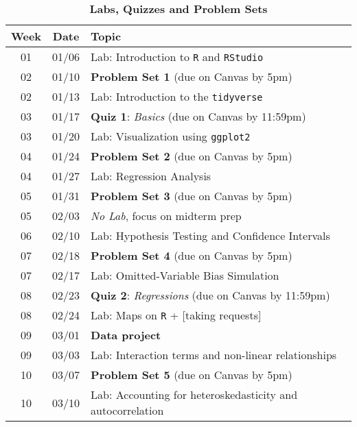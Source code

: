 \documentclass[10pt]{article}
\newcommand{\ra}[1]{\renewcommand{\arraystretch}{#1}}
\begin{document}
\newpage

\begin{table}[h!]
	\caption*{\large\textbf{Labs, Quizzes and Problem Sets}}
	\centering
	\ra{1.5}
	\begin{tabular}{@{\extracolsep{0.5cm}} c c l @{}}
		\toprule
		\textbf{Week} & \textbf{Date} & \textbf{Topic}  \\ \toprule
		01 & 01/06 & Lab: Introduction to \texttt{R} and \texttt{RStudio} \\ 
		02 & 01/10 & \textbf{Problem Set 1} (due on Canvas by 5pm)  \\
		02 & 01/13 & Lab: Introduction to the \texttt{tidyverse} \\ \midrule 
		03 & 01/17 & \textbf{Quiz 1}: \textit{Basics} (due on Canvas by 11:59pm) \\
		03 & 01/20 & Lab: Visualization using \texttt{ggplot2} \\
		04 & 01/24 & \textbf{Problem Set 2} (due on Canvas by 5pm)  \\ 
		04 & 01/27 & Lab: Regression Analysis \\ 
		05 & 01/31 & \textbf{Problem Set 3} (due on Canvas by 5pm) \\ 
		05 & 02/03 & {\it No Lab}, focus on midterm prep \\  \midrule
		06 & 02/10 & Lab: Hypothesis Testing and Confidence Intervals \\
		07 & 02/18 & \textbf{Problem Set 4} (due on Canvas by 5pm)  \\ 
		07 & 02/17 & Lab: Omitted-Variable Bias Simulation \\
		08 & 02/23 & \textbf{Quiz 2}: \textit{Regressions} (due on Canvas by 11:59pm) \\ 
		08 & 02/24 & Lab: Maps on \texttt{R} + [taking requests] \\ \midrule
		09 & 03/01 & {\bf Data project}  \\  
		09 & 03/03 & Lab: Interaction terms and non-linear relationships \\
		10 & 03/07 & \textbf{Problem Set 5} (due on Canvas by 5pm) \\
		10 & 03/10 & Lab: Accounting for heteroskedasticity and autocorrelation \\ \bottomrule
	\end{tabular}
\end{table}
\end{document}
